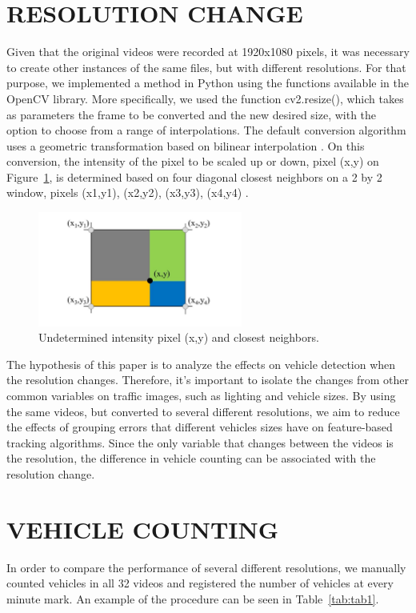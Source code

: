 \documentclass[article,12pt,a4paper,oneside,hidelinks]{memoir}
\begin{document}
\section{RESOLUTION CHANGE}
Given that the original videos were recorded at 1920x1080 pixels, it was necessary to create other instances of the same files, but with different resolutions. For that purpose, we implemented a method in Python using the functions available in the OpenCV library. More specifically, we used the function cv2.resize(), which takes as parameters the frame to be converted and the new desired size, with the option to choose from a range of interpolations. The default conversion algorithm uses a geometric transformation based on bilinear interpolation \citet{OpenCV2016}. On this conversion, the intensity of the pixel to be scaled up or down, pixel (x,y) on Figure~\ref{fig:fig4}, is determined based on four diagonal closest neighbors on a 2 by 2 window, pixels (x1,y1), (x2,y2), (x3,y3), (x4,y4) \citep{Cambridge2019}.

\begin{figure}[h]
	\centering
	\includegraphics[width=0.6\textwidth]{Figuras/fig4.jpg}
	\caption{Undetermined intensity pixel (x,y) and closest neighbors.}
	\label{fig:fig4}
\end{figure}

The hypothesis of this paper is to analyze the effects on vehicle detection when the resolution changes. Therefore, it's important to isolate the changes from other common variables on traffic images, such as lighting and vehicle sizes. By using the same videos, but converted to several different resolutions, we aim to reduce the effects of grouping errors that different vehicles sizes have on feature-based tracking algorithms. Since the only variable that changes between the videos is the resolution, the difference in vehicle counting can be associated with the resolution change.

\section{VEHICLE COUNTING}
In order to compare the performance of several different resolutions, we manually counted vehicles in all 32 videos and registered the number of vehicles at every minute mark. An example of the procedure can be seen in Table~\ref{tab:tab1}.
\end{document}
